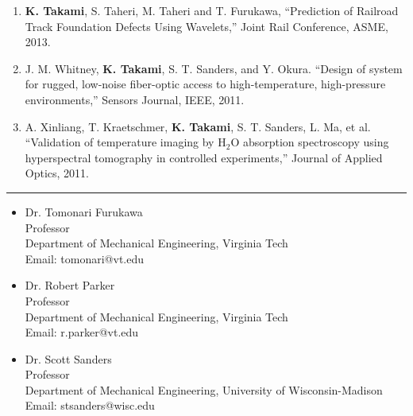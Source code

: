 \documentclass[11pt,letterpaper]{article}
\newcommand{\sect}[1]{\vspace{8mm}{\centering {\bf \large \scshape \uppercase{#1}} \par}  \vskip 2mm   {\color{blue} \hrule height 1pt}\vspace{2mm}}
\begin{document}
\begin{enumerate}
  \item {\bf K. Takami}, S. Taheri, M. Taheri and T. Furukawa, ``Prediction of Railroad Track Foundation Defects Using Wavelets,'' Joint Rail Conference, ASME, 2013.

  \item J. M. Whitney, {\bf K. Takami}, S. T. Sanders, and Y. Okura. ``Design of system for rugged, low-noise fiber-optic access to high-temperature, high-pressure environments,'' Sensors Journal, IEEE, 2011.

  \item A. Xinliang, T. Kraetschmer, {\bf K. Takami}, S. T. Sanders, L. Ma, et al. ``Validation of temperature imaging by H$_2$O absorption spectroscopy using hyperspectral tomography in controlled experiments,'' Journal of Applied Optics, 2011.
\end{enumerate}

\sect{References}
\begin{itemize}
  \item Dr. Tomonari Furukawa\\
  Professor\\Department of Mechanical Engineering, Virginia Tech\\
  Email: tomonari@vt.edu\\
  \item Dr. Robert Parker\\Professor\\Department of Mechanical Engineering, Virginia Tech\\
  Email: r.parker@vt.edu
  \item Dr. Scott Sanders\\Professor\\Department of Mechanical Engineering, University of Wisconsin-Madison\\
  Email: stsanders@wisc.edu
\end{itemize}
\end{document}

